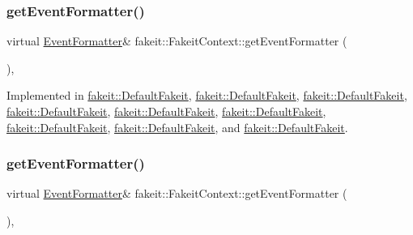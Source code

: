 \mbox{\label{structfakeit_1_1FakeitContext_a066d191292b1002025b02f6569f48b9b}} 
\subsubsection{\texorpdfstring{getEventFormatter()}{getEventFormatter()}\hspace{0.1cm}{\footnotesize\ttfamily [6/9]}}
{\footnotesize\ttfamily virtual \mbox{\hyperlink{structfakeit_1_1EventFormatter}{Event\+Formatter}}\& fakeit\+::\+Fakeit\+Context\+::get\+Event\+Formatter (\begin{DoxyParamCaption}{ }\end{DoxyParamCaption})\hspace{0.3cm}{\ttfamily [protected]}, {}}



Implemented in \mbox{\hyperlink{classfakeit_1_1DefaultFakeit_ae06b5536bcde628ed7e32499eb8b9ac3}{fakeit\+::\+Default\+Fakeit}}, \mbox{\hyperlink{classfakeit_1_1DefaultFakeit_ae06b5536bcde628ed7e32499eb8b9ac3}{fakeit\+::\+Default\+Fakeit}}, \mbox{\hyperlink{classfakeit_1_1DefaultFakeit_ae06b5536bcde628ed7e32499eb8b9ac3}{fakeit\+::\+Default\+Fakeit}}, \mbox{\hyperlink{classfakeit_1_1DefaultFakeit_ae06b5536bcde628ed7e32499eb8b9ac3}{fakeit\+::\+Default\+Fakeit}}, \mbox{\hyperlink{classfakeit_1_1DefaultFakeit_ae06b5536bcde628ed7e32499eb8b9ac3}{fakeit\+::\+Default\+Fakeit}}, \mbox{\hyperlink{classfakeit_1_1DefaultFakeit_ae06b5536bcde628ed7e32499eb8b9ac3}{fakeit\+::\+Default\+Fakeit}}, \mbox{\hyperlink{classfakeit_1_1DefaultFakeit_ae06b5536bcde628ed7e32499eb8b9ac3}{fakeit\+::\+Default\+Fakeit}}, \mbox{\hyperlink{classfakeit_1_1DefaultFakeit_ae06b5536bcde628ed7e32499eb8b9ac3}{fakeit\+::\+Default\+Fakeit}}, and \mbox{\hyperlink{classfakeit_1_1DefaultFakeit_ae06b5536bcde628ed7e32499eb8b9ac3}{fakeit\+::\+Default\+Fakeit}}.

\mbox{\label{structfakeit_1_1FakeitContext_a066d191292b1002025b02f6569f48b9b}} 
\subsubsection{\texorpdfstring{getEventFormatter()}{getEventFormatter()}\hspace{0.1cm}{\footnotesize\ttfamily [7/9]}}
{\footnotesize\ttfamily virtual \mbox{\hyperlink{structfakeit_1_1EventFormatter}{Event\+Formatter}}\& fakeit\+::\+Fakeit\+Context\+::get\+Event\+Formatter (\begin{DoxyParamCaption}{ }\end{DoxyParamCaption})\hspace{0.3cm}{\ttfamily [protected]}, {}}



